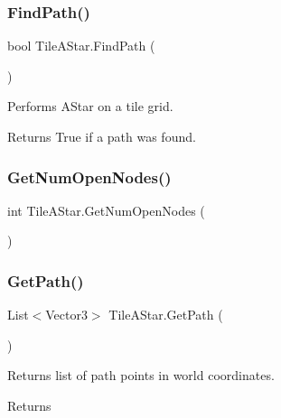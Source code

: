 \subsubsection{\texorpdfstring{Find\+Path()}{FindPath()}}
{\footnotesize\ttfamily bool Tile\+A\+Star.\+Find\+Path (\begin{DoxyParamCaption}{ }\end{DoxyParamCaption})}



Performs A\+Star on a tile grid. 

\begin{DoxyReturn}{Returns}
True if a path was found. 
\end{DoxyReturn}
\mbox{\label{class_tile_a_star_a039b9366e5d285b1c1efe7d3472f80c6}} 
\subsubsection{\texorpdfstring{Get\+Num\+Open\+Nodes()}{GetNumOpenNodes()}}
{\footnotesize\ttfamily int Tile\+A\+Star.\+Get\+Num\+Open\+Nodes (\begin{DoxyParamCaption}{ }\end{DoxyParamCaption})}

\mbox{\label{class_tile_a_star_a4566e80f8a54eb58308274acd8d68f7f}} 
\subsubsection{\texorpdfstring{Get\+Path()}{GetPath()}}
{\footnotesize\ttfamily List$<$Vector3$>$ Tile\+A\+Star.\+Get\+Path (\begin{DoxyParamCaption}{ }\end{DoxyParamCaption})}



Returns list of path points in world coordinates. 

\begin{DoxyReturn}{Returns}

\end{DoxyReturn}
\mbox{\label{class_tile_a_star_ab1b21f2b31d816092c4ae9c04d300b96}} 
